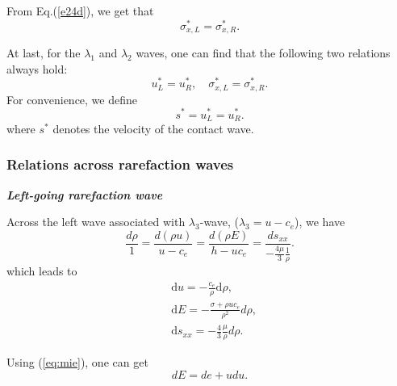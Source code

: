 \documentclass[review]{elsarticle}
\numberwithin{equation}{section}
\numberwithin{table}{section}
\begin{document}

From  Eq.(\ref{e24d}), we  get that
\begin{equation}   \label{e27a}
\sigma_{x,L} ^{\ast}=  \sigma_{x,R} ^{\ast}.
\end{equation}


At last, for the $\lambda_{1}$ and $\lambda_{2}$ waves, one can find
that the following two relations always hold:
\begin{equation}   \label{e28}
u_{L}^{\ast}=u_{R}^{\ast}, \quad
\sigma_{x,L}^{\ast}=\sigma_{x,R}^{\ast}.
\end{equation}
For convenience, we define
\begin{equation}\label{eq:contact}
  s^* = u_L^* = u_R^*. %
\end{equation}
where $s^*$ denotes the velocity of the contact wave.

\subsubsection{Relations across rarefaction waves}\label{sec:rarefaction}

\emph{\textbf{Left-going rarefaction wave} }

Across the left wave associated with $\lambda_3$-wave, ($\lambda_3=u-c_e$), we have
\begin{equation}
  \frac{d\rho}{1} = \frac{d(\rho u)}{u-c_e} = \frac{d(\rho E)}{h-uc_e} = \frac{ds_{xx}}{-\frac{4\mu}{3}\frac{1}{\rho}}.
\end{equation}
which leads to
\begin{align}
  \label{eq:urho}
  & \text{d} u =-\frac{c_e}{\rho}\text{d}\rho,\\
 \label{eq:Erho}
  & \text{d} E = -\frac{\sigma+\rho u c_e}{\rho^2} d\rho,\\
\label{eq:sxxrho}
& \text{d} s_{xx} = -\frac{4}{3}\frac{\mu}{\rho} d\rho.
\end{align}

Using (\ref{eq:mie}), one can get
\begin{equation}\label{te2}
  dE=de+udu.
\end{equation}
\end{document}

